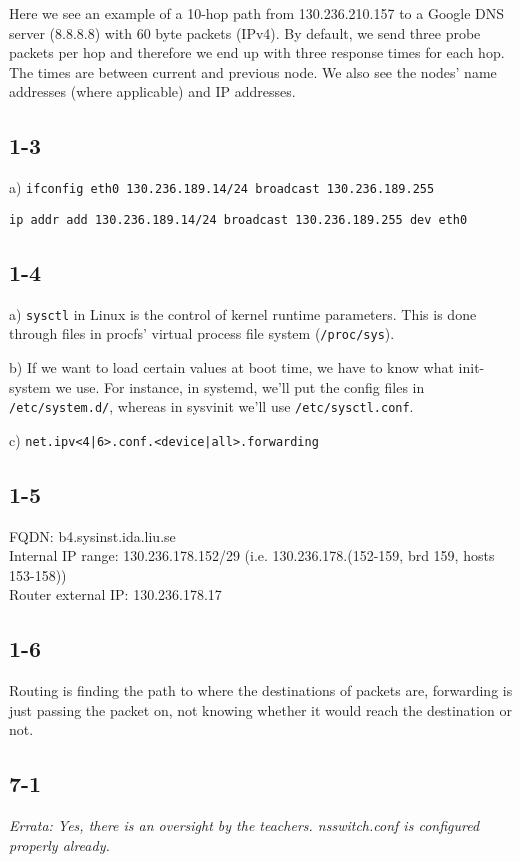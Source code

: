 Here we see an example of a 10-hop path from 130.236.210.157 to a Google DNS server (8.8.8.8) with 60 byte packets (IPv4). By default, we send three probe packets per hop and therefore we end up with three response times for each hop. The times are between current and previous node. We also see the nodes' name addresses (where applicable) and IP addresses.

\subsection{1-3}
a)
\verb=ifconfig eth0 130.236.189.14/24 broadcast 130.236.189.255=

\verb=ip addr add 130.236.189.14/24 broadcast 130.236.189.255 dev eth0=

\subsection{1-4}
a) \verb=sysctl= in Linux is the control of kernel runtime parameters. This is done through files in procfs' virtual process file system (\verb=/proc/sys=).

b) If we want to load certain values at boot time, we have to know what init-system we use. For instance, in systemd, we'll put the config files in \verb=/etc/system.d/=, whereas in sysvinit we'll use \verb=/etc/sysctl.conf=.

c) \verb=net.ipv<4|6>.conf.<device|all>.forwarding=

\subsection{1-5}
FQDN: b4.sysinst.ida.liu.se\\
Internal IP range: 130.236.178.152/29 (i.e. 130.236.178.(152-159, brd 159, hosts 153-158))\\
Router external IP: 130.236.178.17

\subsection{1-6}
Routing is finding the path to where the destinations of packets are, forwarding is just passing the packet on, not knowing whether it would reach the destination or not.

\subsection{7-1}
\emph{Errata: Yes, there is an oversight by the teachers. nsswitch.conf is configured properly already.}

